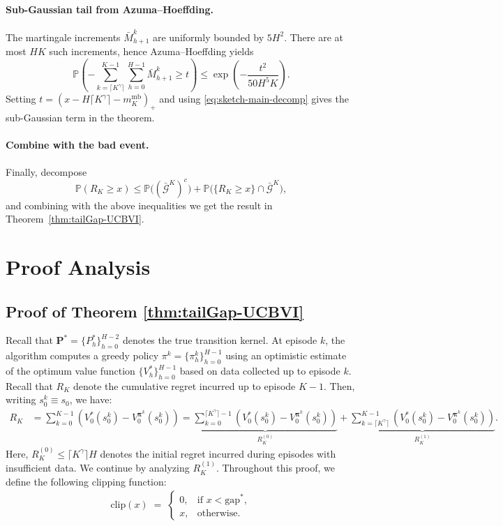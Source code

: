 \documentclass[11pt]{article}
\newcommand{\pii}{\boldsymbol{\pi}}
\newcommand{\pp}{\boldsymbol{P}}
\newcommand{\PP}{\mathbb{P}}
\newcommand{\Dvm}{\bar{M}}
\newcommand{\clip}{\mathrm{clip}}
\newcommand{\gapstar}{\mathrm{gap}^*}
\begin{document}
\paragraph{Sub-Gaussian tail from Azuma--Hoeffding.}
The martingale increments $\Dvm_{h+1}^k$ are uniformly bounded by $5H^2$. There are at most $HK$ such increments, hence Azuma--Hoeffding yields
\[
\PP\!\left(
-\sum_{k=\lceil K^\gamma\rceil}^{K-1}\sum_{h=0}^{H-1}\Dvm_{h+1}^k
\ge t
\right)
\le
\exp\!\left(
-\frac{t^2}{50H^5K}
\right).
\]
Setting $t=(x-H\lceil K^\gamma\rceil-m_K^{\mathrm{mb}})_+$ and using
\eqref{eq:sketch-main-decomp} gives the sub-Gaussian term in the theorem.

\paragraph{Combine with the bad event.}
Finally, decompose
\[
\PP(R_K\ge x)
\le
\PP\big((\bar{\mathcal{G}}^K)^c\big)
+
\PP\big(\{R_K\ge x\}\cap \bar{\mathcal{G}}^K\big),
\]
and combining with the above inequalities we get the result in Theorem~\ref{thm:tailGap-UCBVI}.



\section{Proof Analysis}
\subsection{Proof of Theorem \ref{thm:tailGap-UCBVI}}


Recall that $\pp^* = \{P^*_h\}_{h=0}^{H-2}$ denotes the true transition kernel.  At episode $k$, the algorithm computes a greedy policy $\pi^k = \{\pi^k_h\}_{h=0}^{H-1}$ using an optimistic estimate of the optimum value function $\{V^*_h\}_{h=0}^{H-1}$ based on data collected up to episode $k$. Recall that $R_K$ denote the cumulative regret incurred up to episode $K-1$. Then, writing $s_0^k\equiv s_0$, we have:
\begin{align*}
R_K 
&= \sum_{k=0}^{K-1} \left(V_0^{*}(s_0^k) 
   -  V_0^{\pii^k}(s_0^k)\right)
= \underbrace{\sum_{k=0}^{\lceil K^\gamma\rceil-1} \left( V_0^{*}(s_0^k) - V_0^{\pii^k}(s_0^k)\right) }_{R_K^{(0)}}
 + \underbrace{\sum_{k=\lceil K^\gamma\rceil}^{K-1} \left(V_0^{*}(s_0^k) - V_0^{\pii^k}(s_0^k)\right)}_{R_K^{(1)}}.
\end{align*}
Here, $R_K^{(0)} \le \lceil K^\gamma \rceil H$ denotes the initial regret incurred during episodes with insufficient data. We continue by analyzing $R_K^{(1)}$. Throughout this proof, we define the following clipping function:
\begin{align*}
\clip(x) \;=\;
\begin{cases}
0, & \text{if } x < \gapstar,\\[4pt]
x, & \text{otherwise.}
\end{cases}
\end{align*}
\end{document}
